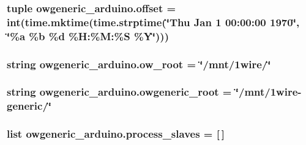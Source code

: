 \hypertarget{namespaceowgeneric__arduino_a30145d36e9de440b44c360e2c295e4aa}{
\subsubsection[{offset}]{\setlength{\rightskip}{0pt plus 5cm}tuple owgeneric\-\_\-arduino.\-offset = int(time.\-mktime(time.\-strptime(\char`\"{}Thu Jan 1 00\-:00\-:00 1970\char`\"{}, \char`\"{}\%a \%{\bf b} \%{\bf d} \%H\-:\%M\-:\%{\bf S} \%{\bf Y}\char`\"{})))}}\label{namespaceowgeneric__arduino_a30145d36e9de440b44c360e2c295e4aa}
\hypertarget{namespaceowgeneric__arduino_acf1b83c6bfca7dce8e079086078b19b9}{
\subsubsection[{ow\-\_\-root}]{\setlength{\rightskip}{0pt plus 5cm}string owgeneric\-\_\-arduino.\-ow\-\_\-root = \char`\"{}/mnt/1wire/\char`\"{}}}\label{namespaceowgeneric__arduino_acf1b83c6bfca7dce8e079086078b19b9}
\hypertarget{namespaceowgeneric__arduino_a55174673236c57dac9b691a2f5b49b69}{
\subsubsection[{owgeneric\-\_\-root}]{\setlength{\rightskip}{0pt plus 5cm}string owgeneric\-\_\-arduino.\-owgeneric\-\_\-root = \char`\"{}/mnt/1wire-\/generic/\char`\"{}}}\label{namespaceowgeneric__arduino_a55174673236c57dac9b691a2f5b49b69}
\hypertarget{namespaceowgeneric__arduino_a88e87453974fbe548a91bf0884be4ad3}{
\subsubsection[{process\-\_\-slaves}]{\setlength{\rightskip}{0pt plus 5cm}list owgeneric\-\_\-arduino.\-process\-\_\-slaves = \mbox{[}$\,$\mbox{]}}}\label{namespaceowgeneric__arduino_a88e87453974fbe548a91bf0884be4ad3}
